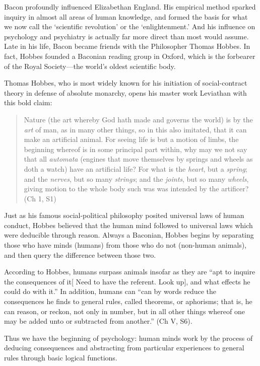 Bacon profoundly influenced Elizabethan England. His empirical method sparked inquiry in almost all areas of human knowledge, and formed the basis for what we now call the `scientific revolution' or the `enlightenment.' And his influence on psychology and psychiatry is actually far more direct than most would assume. Late in his life, Bacon became friends with the Philosopher Thomas Hobbes. In fact, Hobbes founded a Baconian reading group in Oxford, which is the forbearer of the Royal Society—the world's oldest scientific body.

Thomas Hobbes, who is most widely known for his initiation of social-contract theory in defense of absolute monarchy, opens his master work Leviathan with this bold claim:

\begin{quote}

Nature (the art whereby God hath made and governs the world) is by the \emph{art} of man, as in many other things, so in this also imitated, that it can make an artificial animal. For seeing life is but a motion of limbs, the beginning whereof is in some principal part within, why may we not say that all \emph{automata} (engines that move themselves by springs and wheels as doth a watch) have an artificial life? For what is the \emph{heart}, but a \emph{spring}; and the \emph{nerves}, but so many \emph{strings}; and the \emph{joints}, but so many \emph{wheels}, giving motion to the whole body such was was intended by the artificer? (Ch 1, S1)
\end{quote}

Just as his famous social-political philosophy posited universal laws of human conduct, Hobbes believed that the human mind followed to universal laws which were deducible through reason. Always a Baconian, Hobbes begins by separating those who have minds (humans) from those who do not (non-human animals), and then query the difference between those two.

According to Hobbes, humans surpass animals insofar as they are “apt to inquire the consequences of it[ Need to have the referent. Look up], and what effects he could do with it.” In addition, humans can “can by words reduce the consequences he finds to general rules, called theorems, or aphorisms; that is, he can reason, or reckon, not only in number, but in all other things whereof one may be added unto or subtracted from another.” (Ch V, S6). 

Thus we have the beginning of psychology: human minds work by the process of deducing consequences and abstracting from particular experiences to general rules through basic logical functions. 

